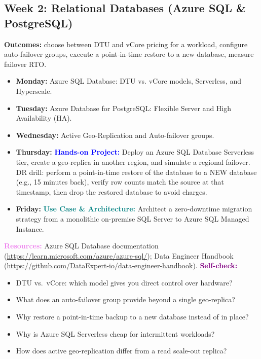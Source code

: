 \documentclass[11pt, a4paper]{article}
\newcommand{\project}[1]{\vspace{1mm}\noindent\textbf{\textcolor{blue}{Hands-on Project:}} #1}
\newcommand{\usecase}[1]{\vspace{1mm}\noindent\textbf{\textcolor{teal}{Use Case \& Architecture:}} #1}
\newcommand{\dayitem}[2]{\item \textbf{#1:} #2}
\newcommand{\resources}[1]{\vspace{1mm}\noindent\textbf{\textcolor{violet}{Resources:}} #1}
\newcommand{\selfcheck}[1]{\vspace{1mm}\noindent\textbf{\textcolor{purple}{Self-check:}} #1}
\begin{document}
\subsection*{Week 2: Relational Databases (Azure SQL \& PostgreSQL)}
\par\noindent\textbf{Outcomes:} choose between DTU and vCore pricing for a workload, configure auto-failover groups, execute a point-in-time restore to a new database, measure failover RTO.
\begin{itemize}[label=-]
    \dayitem{Monday}{Azure SQL Database: DTU vs. vCore models, Serverless, and Hyperscale.}
    \dayitem{Tuesday}{Azure Database for PostgreSQL: Flexible Server and High Availability (HA).}
    \dayitem{Wednesday}{Active Geo-Replication and Auto-failover groups.}
    \dayitem{Thursday}{\project{Deploy an Azure SQL Database Serverless tier, create a geo-replica in another region, and simulate a regional failover. DR drill: perform a point-in-time restore of the database to a NEW database (e.g., 15 minutes back), verify row counts match the source at that timestamp, then drop the restored database to avoid charges.}}
    \dayitem{Friday}{\usecase{Architect a zero-downtime migration strategy from a monolithic on-premise SQL Server to Azure SQL Managed Instance.}}
\end{itemize}
\resources{Azure SQL Database documentation (\url{https://learn.microsoft.com/azure/azure-sql/}); Data Engineer Handbook (\url{https://github.com/DataExpert-io/data-engineer-handbook}).}
\selfcheck{\begin{itemize}[label=-, itemsep=0pt]
    \item DTU vs.\ vCore: which model gives you direct control over hardware?
    \item What does an auto-failover group provide beyond a single geo-replica?
    \item Why restore a point-in-time backup to a new database instead of in place?
    \item Why is Azure SQL Serverless cheap for intermittent workloads?
    \item How does active geo-replication differ from a read scale-out replica?
\end{itemize}}
\end{document}
